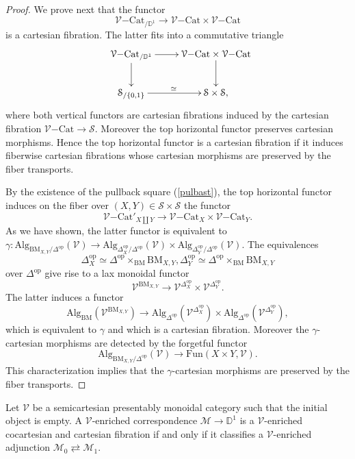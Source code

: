 \documentclass[10pt,oneside]{article}
\numberwithin{equation}{section} %
\numberwithin{figure}{section} %
\theoremstyle{plain}
\theoremstyle{definition}
\newcommand{\bD}{{\mathbb D}}
\newcommand{\mM}{{\mathcal M}}
\newcommand{\mS}{{\mathcal S}}
\newcommand{\mV}{{\mathcal V}}
\newcommand{\op}{\mathrm{op}}
\newcommand{\Cat}{\mathrm{Cat}}
\newcommand{\Alg}{\mathrm{Alg}}
\newcommand{\Fun}{\mathrm{Fun}}
\newcommand{\BM}{\mathrm{BM}}
\begin{document}
\begin{proof}
We prove next that the functor 
$$ {\mV\mathrm{-}\Cat}_{/\bD^1} \to {\mV\mathrm{-}\Cat} \times {\mV\mathrm{-}\Cat}$$
is a cartesian fibration.
The latter fits into a commutative triangle 
$$\begin{xy}\label{pulbast}
\xymatrix{
{\mV\mathrm{-}\Cat}_{/\bD^1} \ar[d]^{} \ar[r]
& {\mV\mathrm{-}\Cat} \times {\mV\mathrm{-}\Cat} \ar[d]
\\ 
\mS_{/\{0,1\}} \ar[r]^\simeq &  \mS \times \mS,}
\end{xy}$$
where both vertical functors are cartesian fibrations induced by the cartesian fibration ${\mV\mathrm{-}\Cat} \to \mS$. Moreover the top horizontal functor preserves cartesian morphisms.
Hence the top horizontal functor is a cartesian fibration if it induces fiberwise cartesian fibrations whose cartesian morphisms are preserved by the fiber transports.

By the existence of the pullback square (\ref{pulbast}), the top horizontal functor induces on the fiber over $(X,Y) \in \mS \times \mS$
the functor 
$$ {\mV\mathrm{-}\Cat}'_{X \coprod Y} \to {\mV\mathrm{-}\Cat}_{X} \times {\mV\mathrm{-}\Cat}_{Y}.$$
As we have shown, the latter functor is equivalent to 
$ \gamma: \Alg_{\BM_{X,Y}/\Delta^\op}(\mV) \to \Alg_{\Delta^\op_{X}/\Delta^\op}(\mV) \times \Alg_{\Delta^\op_{Y}/\Delta^\op}(\mV).$ The equivalences $$ \Delta^\op_X \simeq \Delta^\op \times_\BM \BM_{X,Y}, \Delta^\op_Y \simeq \Delta^\op \times_\BM \BM_{X,Y}$$ over $\Delta^\op$ give rise to a lax monoidal functor
$$ \mV^{\BM_{X,Y}} \to \mV^{\Delta^\op_X} \times \mV^{\Delta^\op_Y}.$$
The latter induces a functor 
$$ \Alg_\BM(\mV^{\BM_{X,Y}}) \to \Alg_{\Delta^\op}(\mV^{\Delta^\op_X}) \times \Alg_{\Delta^\op}(\mV^{\Delta^\op_Y}), $$
which is equivalent to $\gamma$ and which is a cartesian fibration. Moreover the $\gamma$-cartesian morphisms are detected by the forgetful functor
$$  \Alg_{\BM_{X,Y}/\Delta^\op}(\mV) \to \Fun(X \times Y,\mV).$$
This characterization implies that the $\gamma$-cartesian morphisms are preserved by the fiber transports. 
\end{proof}

\begin{corollary} Let $\mV$ be a semicartesian presentably monoidal category such that the initial object is empty.
A $\mV$-enriched correspondence $\mM \to \bD^1$ is a $\mV$-enriched cocartesian and cartesian fibration if and only if it classifies a $\mV$-enriched adjunction $\mM_0 \rightleftarrows \mM_1.$
    
\end{corollary}
\end{document}
